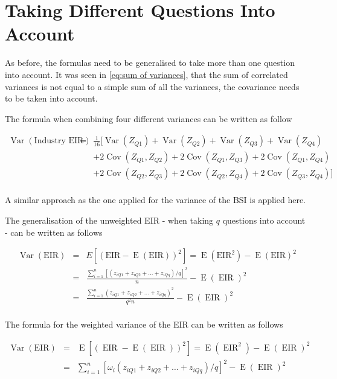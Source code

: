 \documentclass[12pt,a4paper,oneside]{book}
\DeclareMathOperator{\Var}{Var}
\DeclareMathOperator{\Cov}{Cov}
\DeclareMathOperator{\E}{E}
\DeclareMathOperator{\EIR}{EIR}
\begin{document}
\section{Taking Different Questions Into Account}

As before, the formulas need to be generalised to take more than one question into account.
It was seen in \autoref{eq:sum of variances}, that the sum of correlated variances is not equal to a simple sum of all the variances, the covariance needs to be taken into account.

The formula when combining four different variances can be written as follow

\begin{eqnarray}
    \Var \left( \text{Industry EIR} \right) 
    &=& \frac{1}{16} \Big[ \Var(Z_{Q1}) + \Var(Z_{Q2}) + \Var(Z_{Q3}) + \Var(Z_{Q4}) \nonumber \\
    && + 2 \Cov (Z_{Q1},Z_{Q2}) + 2 \Cov (Z_{Q1},Z_{Q3}) + 2 \Cov (Z_{Q1},Z_{Q4}) \nonumber \\
    &&  + 2 \Cov (Z_{Q2},Z_{Q3}) + 2 \Cov (Z_{Q2},Z_{Q4}) + 2 \Cov (Z_{Q3},Z_{Q4}) \Big] \nonumber \\
\end{eqnarray}


A similar approach as the one applied for the variance of the BSI is applied here.

The generalisation of the unweighted EIR - when taking $q$ questions into account - can be written as follows

\begin{eqnarray}
         \Var(\text{EIR}) &=& E \left[ \left(\text{EIR}-\E(\text{EIR}) \right)^2 \right] =  \E \left( \text{EIR}^2\right) - \E \left( \text{EIR}\right)^2 \\ 
         &=&  \frac{\sum^n_{i=1}[(z_{iQ1} + z_{iQ2} + \ldots + z_{iQq})/q]^2}{n} - \E (\EIR)^2 \\
        &=&  \frac{\sum^n_{i=1}(z_{iQ1} + z_{iQ2} + \ldots + z_{iQq})^2}{q^2 n} - \E (\EIR)^2 \\
\nonumber
\end{eqnarray}

The formula for the weighted variance of the EIR can be written as follows

\begin{eqnarray}
         \Var(\text{EIR}) &=& \E \left[ \left( \EIR - \E(\EIR) \right)^2 \right] =  \E \left( \EIR^2\right) - \E \left( \EIR \right)^2 \\ 
         &=&  \sum^n_{i=1} \left[\omega_i (z_{iQ1} + z_{iQ2} + \ldots + z_{iQq})/q \right]^2 - \E (\EIR)^2 \\ \nonumber
\end{eqnarray}
\end{document}

